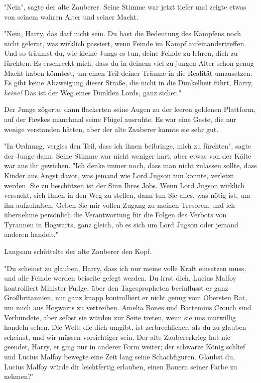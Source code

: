 {"Nein", sagte der alte Zauberer. Seine Stimme war jetzt tiefer und zeigte etwas von seinem wahren Alter und seiner Macht.

"Nein, Harry, das darf nicht sein. Du hast die Bedeutung des Kämpfens noch nicht gelernt, was wirklich passiert, wenn Feinde im Kampf aufeinandertreffen. Und so träumst du, wie kleine Jungs es tun, deine Feinde zu lehren, dich zu fürchten. Es erschreckt mich, dass du in deinem viel zu jungen Alter schon genug Macht haben könntest, um einen Teil deiner Träume in die Realität umzusetzen. Es gibt keine Abzweigung dieser Straße, die nicht in die Dunkelheit führt, Harry, \emph{keine!} Das ist der Weg eines Dunklen Lords, ganz sicher."

Der Junge zögerte, dann flackerten seine Augen zu der leeren goldenen Plattform, auf der Fawkes manchmal seine Flügel ausruhte. Es war eine Geste, die nur wenige verstanden hätten, aber der alte Zauberer kannte sie sehr gut.

"In Ordnung, vergiss den Teil, dass ich ihnen beibringe, mich zu fürchten", sagte der Junge dann. Seine Stimme war nicht weniger hart, aber etwas von der Kälte war aus ihr gewichen. "Ich denke immer noch, dass man nicht zulassen sollte, dass Kinder aus Angst davor, was jemand wie Lord Jugson tun könnte, verletzt werden. Sie zu beschützen ist der Sinn Ihres Jobs. Wenn Lord Jugson wirklich versucht, sich Ihnen in den Weg zu stellen, dann tun Sie alles, was nötig ist, um ihn aufzuhalten. Geben Sie mir vollen Zugang zu meinen Tresoren, und ich übernehme persönlich die Verantwortung für die Folgen des Verbots von Tyrannen in Hogwarts, ganz gleich, ob es sich um Lord Jugson oder jemand anderen handelt."

Langsam schüttelte der alte Zauberer den Kopf.

"Du scheinst zu glauben, Harry, dass ich nur meine volle Kraft einsetzen muss, und alle Feinde werden beiseite gefegt werden. Du irrst dich. Lucius Malfoy kontrolliert Minister Fudge, über den Tagespropheten beeinflusst er ganz Großbritannien, nur ganz knapp kontrolliert er nicht genug vom Obersten Rat, um mich aus Hogwarts zu vertreiben. Amelia Bones und Bartemius Crouch sind Verbündete, aber selbst sie würden zur Seite treten, wenn sie uns mutwillig handeln sehen. Die Welt, die dich umgibt, ist zerbrechlicher, als du zu glauben scheinst, und wir müssen vorsichtiger sein. Der alte Zaubererkrieg hat nie geendet, Harry, er ging nur in anderer Form weiter; der schwarze König schlief und Lucius Malfoy bewegte eine Zeit lang seine Schachfiguren. Glaubst du, Lucius Malfoy würde dir leichtfertig erlauben, einen Bauern seiner Farbe zu nehmen?"

}
